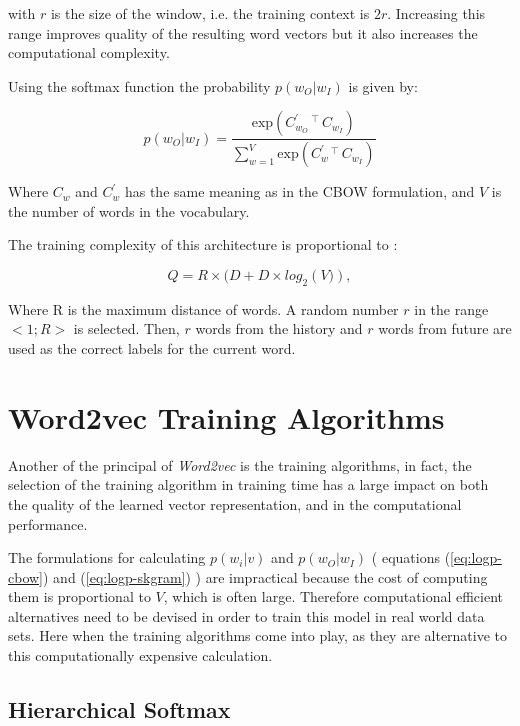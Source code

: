 with $r$ is the size of the window, i.e. the training context is $2r$.  Increasing
this range improves quality of the resulting word vectors but it also
increases the computational complexity.

Using the softmax function the probability  $p(w_O|w_I)$ is given by:

\begin{equation}
  \label{eq:logp-skgram}
  p(w_O|w_I) = \frac{\text{exp}\left(C^{'}_{w_O}\,^\top\,C_{w_I} \right)
  }{\sum^{V}_{w=1} \text{exp} \left( C^{'}_w \,^\top\, C_{w_I} \right)   }  
\end{equation}


Where $C_w$ and $C^{'}_w$  has the same meaning as in the \ac{CBOW} formulation,  and $V$ is the number of
words in the vocabulary.

The training complexity of this architecture is proportional to
\cite{DBLP:journals/corr/abs-1301-3781}:

\begin{equation}
  Q = R \times (D + D \times log_2 \left(V)\right),  
\end{equation}

Where R is the maximum distance of words. A random number $r$ in the range $<
1; R >$ is selected. Then, $r$ words from the history and $r$ words from future are used as the correct labels for the current word.
 

\section{Word2vec Training Algorithms}
\label{sec:word2v-tran-algorithms}
Another of the principal of  \textit{Word2vec} is the training algorithms, in
fact, the selection of the training algorithm in training time has a large  impact on
both the quality of the learned vector representation,  and in the
computational performance.

The formulations for calculating $p(w_i|v)$ and  $p(w_O|w_I)$  ( equations
(\ref{eq:logp-cbow})  and  (\ref{eq:logp-skgram}) ) are impractical because
the cost of computing them is proportional to $V$, which is often large.
Therefore computational efficient alternatives need to be devised in order to
train this model in real world data sets. Here when the training algorithms
come into play, as they are alternative to this computationally expensive
calculation. 

\subsection{Hierarchical Softmax}
\label{sec:sub-hs}


